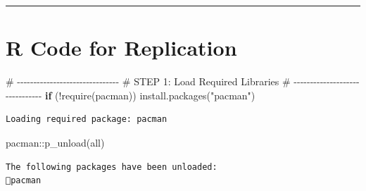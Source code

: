 \documentclass[
  letterpaper,
  DIV=11,
  numbers=noendperiod]{scrartcl}
\newenvironment{Shaded}{\begin{snugshade}}{\end{snugshade}}
\newcommand{\CommentTok}[1]{\textcolor[rgb]{0.37,0.37,0.37}{#1}}
\newcommand{\ControlFlowTok}[1]{\textcolor[rgb]{0.00,0.23,0.31}{\textbf{#1}}}
\newcommand{\FunctionTok}[1]{\textcolor[rgb]{0.28,0.35,0.67}{#1}}
\newcommand{\NormalTok}[1]{\textcolor[rgb]{0.00,0.23,0.31}{#1}}
\newcommand{\SpecialCharTok}[1]{\textcolor[rgb]{0.37,0.37,0.37}{#1}}
\newcommand{\StringTok}[1]{\textcolor[rgb]{0.13,0.47,0.30}{#1}}
\begin{document}
\begin{center}\rule{0.5\linewidth}{0.5pt}\end{center}

\section{R Code for Replication}\label{r-code-for-replication}

\begin{Shaded}
\begin{Highlighting}[]
\CommentTok{\# {-}{-}{-}{-}{-}{-}{-}{-}{-}{-}{-}{-}{-}{-}{-}{-}{-}{-}{-}{-}{-}{-}{-}{-}{-}{-}{-}{-}{-}{-}{-}}
\CommentTok{\# STEP 1: Load Required Libraries}
\CommentTok{\# {-}{-}{-}{-}{-}{-}{-}{-}{-}{-}{-}{-}{-}{-}{-}{-}{-}{-}{-}{-}{-}{-}{-}{-}{-}{-}{-}{-}{-}{-}{-}}
\ControlFlowTok{if}\NormalTok{ (}\SpecialCharTok{!}\FunctionTok{require}\NormalTok{(pacman)) }\FunctionTok{install.packages}\NormalTok{(}\StringTok{"pacman"}\NormalTok{)}
\end{Highlighting}
\end{Shaded}

\begin{verbatim}
Loading required package: pacman
\end{verbatim}

\begin{Shaded}
\begin{Highlighting}[]
\NormalTok{pacman}\SpecialCharTok{::}\FunctionTok{p\_unload}\NormalTok{(all)}
\end{Highlighting}
\end{Shaded}

\begin{verbatim}
The following packages have been unloaded:
pacman
\end{verbatim}
\end{document}
